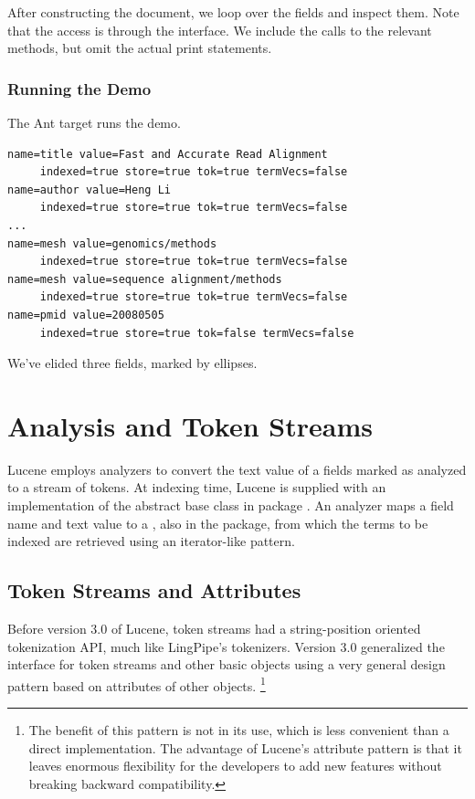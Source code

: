 After constructing the document, we loop over the fields and
inspect them.
%
%
Note that the access is through the  interface.
We include the calls to the relevant methods, 
but omit the actual print statements.

\subsubsection{Running the Demo}

The Ant target  runs the demo.  
%
\begin{verbatim}
name=title value=Fast and Accurate Read Alignment
     indexed=true store=true tok=true termVecs=false
name=author value=Heng Li
     indexed=true store=true tok=true termVecs=false
...
name=mesh value=genomics/methods
     indexed=true store=true tok=true termVecs=false
name=mesh value=sequence alignment/methods
     indexed=true store=true tok=true termVecs=false
name=pmid value=20080505
     indexed=true store=true tok=false termVecs=false
\end{verbatim}
%
We've elided three fields, marked by ellipses.



\section{Analysis and Token Streams}\label{section:lucene-analysis}

Lucene employs analyzers to convert the text value
of a fields marked as analyzed to a stream of tokens.  At indexing
time, Lucene is supplied with an implementation of the abstract base
class  in package .
An analyzer maps a field name and text value to a ,
also in the  package, from which the terms to be
indexed are retrieved using an iterator-like pattern.

\subsection{Token Streams and Attributes}

Before version 3.0 of Lucene, token streams had a string-position
oriented tokenization API, much like LingPipe's tokenizers.  Version
3.0 generalized the interface for token streams and other basic
objects using a very general design pattern based on attributes of
other objects.
%
\footnote{The benefit of this pattern is not in its use, which is less
  convenient than a direct implementation.  The advantage of Lucene's
  attribute pattern is that it leaves enormous flexibility for the
  developers to add new features without breaking backward
  compatibility.}

